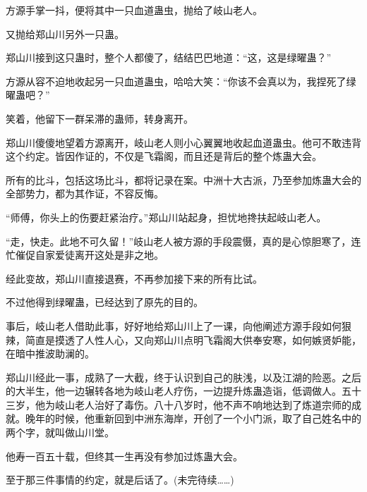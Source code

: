\begin{this_body}
方源手掌一抖，便将其中一只血道蛊虫，抛给了岐山老人。

又抛给郑山川另外一只蛊。

郑山川接到这只蛊时，整个人都傻了，结结巴巴地道：“这，这是绿曜蛊？”

方源从容不迫地收起另一只血道蛊虫，哈哈大笑：“你该不会真以为，我捏死了绿曜蛊吧？”

笑着，他留下一群呆滞的蛊师，转身离开。

郑山川傻傻地望着方源离开，岐山老人则小心翼翼地收起血道蛊虫。他可不敢违背这个约定。皆因作证的，不仅是飞霜阁，而且还是背后的整个炼蛊大会。

所有的比斗，包括这场比斗，都将记录在案。中洲十大古派，乃至参加炼蛊大会的全部势力，都为其作证，不容反悔。

“师傅，你头上的伤要赶紧治疗。”郑山川站起身，担忧地搀扶起岐山老人。

“走，快走。此地不可久留！”岐山老人被方源的手段震慑，真的是心惊胆寒了，连忙催促自家爱徒离开这处是非之地。

经此变故，郑山川直接退赛，不再参加接下来的所有比试。

不过他得到绿曜蛊，已经达到了原先的目的。

事后，岐山老人借助此事，好好地给郑山川上了一课，向他阐述方源手段如何狠辣，简直是摸透了人性人心，又向郑山川点明飞霜阁大供奉安寒，如何嫉贤妒能，在暗中推波助澜的。

郑山川经此一事，成熟了一大截，终于认识到自己的肤浅，以及江湖的险恶。之后的大半生，他一边辗转各地为岐山老人疗伤，一边提升炼蛊造诣，低调做人。五十三岁，他为岐山老人治好了毒伤。八十八岁时，他不声不响地达到了炼道宗师的成就。晚年的时候，他重新回到中洲东海岸，开创了一个小门派，取了自己姓名中的两个字，就叫做山川堂。

他寿一百五十载，但终其一生再没有参加过炼蛊大会。

至于那三件事情的约定，就是后话了。(未完待续……)

\end{this_body}

